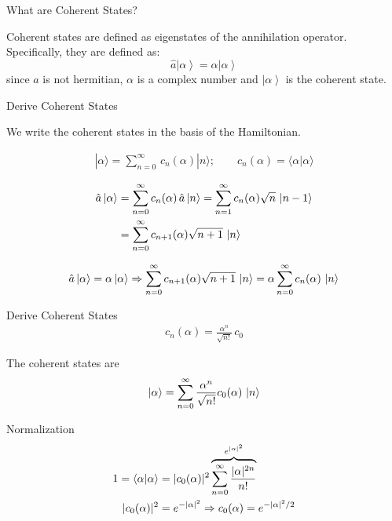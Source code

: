 \documentclass{loyola-beamer}
\begin{document}
\begin{frame}{What are Coherent States?}

    Coherent states are defined as eigenstates of the annihilation operator. Specifically, they are defined as:
    \begin{equation}
        \hat{a} \left| \alpha \right\rangle = \alpha \left| \alpha \right\rangle
    \end{equation}
    since $\hat{a}$ is not hermitian, $\alpha$ is a complex number and $\left|\alpha\right\rangle$ is the coherent state.

\end{frame}

\begin{frame}{Derive Coherent States}

    We write the coherent states in the basis of the Hamiltonian.

    \begin{align*}
        | \alpha \rangle  = \sum_{n=0}^{\infty} \, c_n(\alpha) |n \rangle;
        \qquad c_n(\alpha) = \langle \alpha | \alpha \rangle
    \end{align*}

    \begin{align*}
        \hat{a} \ket{\alpha} & = \sum_{n=0}^\infty c_n(\alpha)\, \hat{a} \ket{n}
        = \sum_{n=1}^\infty c_n(\alpha)\sqrt{n}\, \ket{n-1}                            \\
                             & = \sum_{n=0}^\infty c_{n+1}(\alpha)\sqrt{n+1}\, \ket{n}
    \end{align*}

    \begin{align*}
        \hat{a} \ket{\alpha} = \alpha \ket{\alpha} \Rightarrow
        \sum_{n=0}^\infty c_{n+1}(\alpha)\sqrt{n+1}\, \ket{n}
        = \alpha \sum_{n=0}^\infty c_{n}(\alpha)\, \ket{n}
    \end{align*}

\end{frame}

\begin{frame}{Derive Coherent States}
    \begin{align*}
        c_n(\alpha) = \frac{\alpha^n}{\sqrt{n!}}\, c_0
    \end{align*}

    The coherent states are
    \begin{align*}
        \ket{\alpha} = \sum_{n=0}^\infty \frac{\alpha^n}{\sqrt{n!}} c_0(\alpha) \, \ket{n}
    \end{align*}

    Normalization
    \begin{align*}
        1= \bra{\alpha}\ket{\alpha} & = | c_0(\alpha) |^2
        \overbrace{\sum_{n=0}^\infty \frac{|\alpha|^{2n}}{n!}}^{e^{|\alpha|^2}} \\
        | c_0(\alpha) |^2           & = e^{-|\alpha|^2}
        \Rightarrow c_0(\alpha) = e^{-|\alpha|^2/2}
    \end{align*}



\end{frame}
\end{document}
